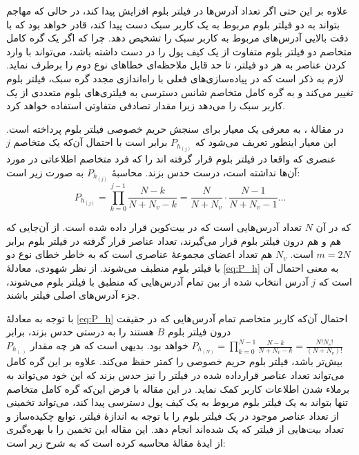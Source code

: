 علاوه بر این حتی اگر تعداد آدرس‌ها در فیلتر‌ بلوم افزایش پیدا کند، در حالی که مهاجم بتواند به دو فیلتر بلوم مربوط به یک کاربر سبک دست پیدا کند، قادر خواهد بود که با دقت بالایی آدرس‌های مربوط به کاربر سبک را تشخیص دهد. چرا که اگر یک گره کامل متخاصم دو فیلتر بلوم متفاوت از یک کیف پول را در دست داشته باشد، می‌تواند با وارد کردن عناصر به هر دو فیلتر، تا حد قابل ملاحظه‌ای خطاهای نوع دوم را برطرف نماید\cite{Nick2015}. لازم به ذکر است که در پیاده‌سازی‌های فعلی با راه‌اندازی مجدد گره سبک، فیلتر بلوم تغییر می‌کند و به گره کامل متخاصم شانس دسترسی به فیلتری‌های بلوم متعددی از یک کاربر سبک را می‌دهد\cite{Gervais2014} زیرا مقدار تصادفی  متفاوتی استفاده خواهد کرد.

در مقالهٔ \cite{Gervais2014}، به معرفی یک معیار برای سنجش حریم خصوصی  فیلتر بلوم پرداخته است. این معیار اینطور تعریف می‌شود که 
$P_{h_{(j)}}$
 برابر است با احتمال آن‌که یک متخاصم ‌$j$ عنصری که واقعا در فیلتر بلوم قرار گرفته اند را که فرد متخاصم اطلاعاتی در مورد آن‌ها نداشته است، درست حدس بزند. محاسبهٔ $P_{h_{(j)}}$ به صورت زیر است:
 \begin{equation}
 \label{eq:P_h}
 P_{h_{(j)}} = \prod_{k=0}^{j-1}\frac{N-k}{N+N_v-k} = \frac{N}{N+N_v}\cdot\frac{N-1}{N+N_v-1} \ldots
 \end{equation}
  
  که در آن $N$ تعداد آدرس‌هایی است که در بیت‌کوین قرار داده شده است. از آن‌جایی که هم  و هم  درون فیلتر بلوم قرار می‌گیرند، تعداد عناصر قرار گرفته در فیلتر بلوم برابر $m=2N$ است. $N_v$ هم تعداد اعضای مجموعه‌ٔ عناصری است که به خاطر خطای نوع دو با فیلتر بلوم منطبف می‌شوند. از نظر شهودی، معادلهٔ \eqref{eq:P_h} به معنی احتمال آن است که $j$ آدرس انتخاب شده از بین تمام آدرس‌هایی که منطبق با فیلتر بلوم می‌شوند، جزء آدرس‌های اصلی فیلتر باشند.
  
   با توجه به معادلهٔ \eqref{eq:P_h} احتمال آن‌که کاربر متخاصم تمام آدرس‌هایی که در حقیقت درون فیلتر بلوم $B$ هستند را به درستی حدس بزند، برابر 
  $P_{h_{(N)}} = \prod_{k=0}^{N-1}\frac{N-k}{N+N_v-k} = \frac{N!N_v!}{(N+N_v)!}$
  خواهد بود\cite{Gervais2014}. بدیهی است که هر چه مقدار $P_{h_{(.)}}$ بیش‌تر باشد،‌ فیلتر بلوم حریم خصوصی را کمتر حفظ می‌کند. علاوه بر این گره کامل می‌تواند تعداد عناصر قرارداده شده در فیلتر را نیز حدس بزند که این خود می‌تواند به برملاء شدن اطلاعات کاربر کمک نماید. در این مقاله با فرض این‌که گره کامل متخاصم تنها بتواند به یک فیلتر بلوم مربوط به یک کیف پول دسترسی پیدا کند، می‌تواند تخمینی از تعداد عناصر موجود در یک فیلتر بلوم را با توجه به اندازهٔ فیلتر، توابع چکیده‌ساز و تعداد بیت‌هایی از فیلتر که یک شده‌اند انجام دهد. این مقاله این تخمین را با بهره‌گیری از ایدهٔ مقالهٔ \cite{Swamidass2007} محاسبه کرده است که به شرح زیر است:
  
